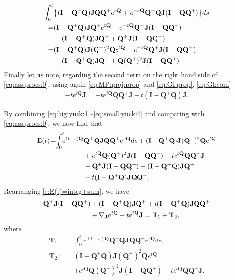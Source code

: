 \documentclass[9pt,twocolumn,twoside]{pnas-new}
\newcommand{\?}{\textbf{?}}
\newcommand{\QQ}{\mathbf{Q}}
\newcommand{\JJ}{\mathbf{J}}
\newcommand{\II}{\mathbf{I}}
\newcommand{\Z}{\mathbf{E}}
\newcommand{\TT}{\mathbf{T}}
\begin{document}
\begin{align}
  \int_0^t& \big\{(\II -\QQ^+ \QQ) \JJ \QQ \QQ^{+} e^{s\QQ}
                             + e^{-s\QQ}\QQ^+ \QQ \JJ (\II - \QQ \QQ^{+})\big\}ds
                             \notag\\
   =& (\II -\QQ^+ \QQ) \JJ \QQ^{+}e^{t\QQ}
      - e^{-t\QQ} \QQ^+ \JJ (\II - \QQ \QQ^{+})
      \notag\\
    &- (\II -\QQ^+ \QQ) \JJ \QQ^{+} 
      +  \QQ^+ \JJ (\II - \QQ \QQ^{+})
      \notag\\
   =& (\II -\QQ^+ \QQ) \JJ (\QQ^+)^2 \QQ e^{t\QQ}
      - e^{-t\QQ} \QQ^+ \JJ (\II - \QQ \QQ^{+})
      \notag\\
    &- (\II -\QQ^+ \QQ) \JJ \QQ^{+} 
      + \QQ (\QQ^+)^2 \JJ (\II - \QQ \QQ^{+})
             \label{eq:big:yuck:3}                          
\end{align}
Finally let us note, regarding the second term on the right hand side
of \eqref{eq:ass:procs:0}, using again 
\eqref{eq:MP:proj:prop} and \eqref{eq:GI:prop}, \eqref{eq:GI:com}
\begin{align}
  -te^{t\QQ}\JJ 
  =-te^{t\QQ}\QQ \QQ^+ \JJ  - t (\II - \QQ^+\QQ) \JJ.
               \label{eq:small:yuck:4}                          
\end{align}

By combining \eqref{eq:big:yuck:1}--\eqref{eq:small:yuck:4} and
comparing with \eqref{eq:ass:procs:0}, we now find that
\begin{align}\label{e:E(t)=integ+sum}
  \Z(t)\! =\! \! \int_0^t \! \! \! e^{(t-s)\QQ} &\QQ^+ \QQ \JJ \QQ \QQ^{+} e^{s\QQ}ds
           + (\II - \!\QQ^+ \QQ) \JJ (\QQ^{+})^2\QQ e^{t\QQ}
           \notag\\
           &+ e^{t\QQ} \QQ (\QQ^+)^2 \JJ (\II - \QQ \QQ^{+}) -te^{t\QQ}\QQ \QQ^+ \JJ 
           \notag\\
           &-\QQ^+ \JJ (\II - \QQ \QQ^{+})- (\II -\QQ^+ \QQ) \JJ \QQ^{+}
             \notag\\
         &-t(\II -\QQ^+ \QQ) \JJ \QQ \QQ^{+}.
\end{align}
Rearranging \eqref{e:E(t)=integ+sum}, we have 
\begin{align*}
\QQ^+ \JJ (\II - \QQ \QQ^{+}) &+(\II -\QQ^+ \QQ) \JJ \QQ^{+}
   +t(\II -\QQ^+ \QQ) \JJ \QQ \QQ^{+}
                                \notag\\
  &+  \nabla_\JJ e^{t \QQ} - t  e^{t\QQ} \JJ
  = \TT_1 + \TT_2,
\end{align*}
where 
\begin{align*}
 \TT_1 :=&  \int_0^t  \! \! e^{(t-s)\QQ} \QQ^+ \QQ \JJ \QQ \QQ^{+} e^{s\QQ}ds,\\
  \TT_2 :=&  (\II -\QQ^+ \QQ) \JJ (\QQ^{+})^2\QQ e^{t\QQ}\\
         &+ e^{t\QQ} \QQ (\QQ^+)^2 \JJ (\II - \QQ \QQ^{+}) -te^{t\QQ}\QQ \QQ^+ \JJ.
\end{align*}
\end{document}
